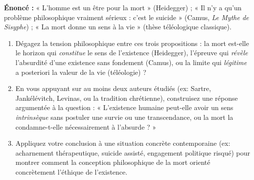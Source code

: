 \documentclass[11pt]{article}
\begin{document}
\begin{exercice}
\textbf{Énoncé :} « L'homme est un être pour la mort » (Heidegger) ; « Il n'y a qu'un problème philosophique vraiment sérieux : c'est le suicide » (Camus, \textit{Le Mythe de Sisyphe}) ; « La mort donne un sens à la vie » (thèse téléologique classique). 
\begin{enumerate}
    \item[2 pts] Dégagez la tension philosophique entre ces trois propositions : la mort est-elle le horizon qui \textit{constitue} le sens de l'existence (Heidegger), l'épreuve qui \textit{révèle} l'absurdité d'une existence sans fondement (Camus), ou la limite qui \textit{légitime} a posteriori la valeur de la vie (téléologie) ?
    \item[3 pts] En vous appuyant sur au moins deux auteurs étudiés (ex: Sartre, Jankélévitch, Levinas, ou la tradition chrétienne), construisez une réponse argumentée à la question : « L'existence humaine peut-elle avoir un sens \textit{intrinsèque} sans postuler une survie ou une transcendance, ou la mort la condamne-t-elle nécessairement à l'absurde ? »
    \item[2 pts] Appliquez votre conclusion à une situation concrète contemporaine (ex: acharnement thérapeutique, suicide assisté, engagement politique risqué) pour montrer comment la conception philosophique de la mort orienté concrètement l'éthique de l'existence.
\end{enumerate}
\end{exercice}
\end{document}
